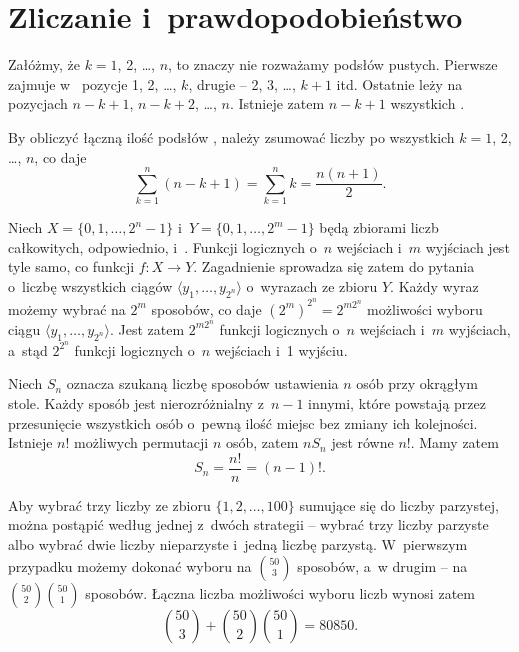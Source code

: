 \chapter{Zliczanie i~prawdopodobieństwo}


\exercise %
Załóżmy, że $k=1$, 2, \dots, $n$, to znaczy nie rozważamy podsłów pustych.
Pierwsze  zajmuje w~ pozycje 1, 2, \dots, $k$, drugie -- 2, 3, \dots, $k+1$ itd.
Ostatnie  leży na pozycjach $n-k+1$, $n-k+2$, \dots, $n$.
Istnieje zatem $n-k+1$ wszystkich  .

By obliczyć łączną ilość podsłów , należy zsumować liczby  po wszystkich $k=1$, 2, \dots, $n$, co daje
\[
	\sum_{k=1}^n(n-k+1) = \sum_{k=1}^nk = \frac{n(n+1)}{2}.
\]

\exercise %
Niech $X=\{0,1,\dots,2^n-1\}$ i~$Y=\{0,1,\dots,2^m-1\}$ będą zbiorami liczb całkowitych, odpowiednio,  i~.
Funkcji logicznych o~$n$ wejściach i~$m$ wyjściach jest tyle samo, co funkcji $f\colon X\to Y$.
Zagadnienie sprowadza się zatem do pytania o~liczbę wszystkich ciągów $\langle y_1,\dots,y_{2^n}\!\rangle$ o~wyrazach ze zbioru $Y$.
Każdy wyraz możemy wybrać na $2^m$ sposobów, co daje $(2^m)^{2^n}=2^{m2^n}\!$ możliwości wyboru ciągu $\langle y_1,\dots,y_{2^n}\!\rangle$.
Jest zatem $2^{m2^n}\!$ funkcji logicznych o~$n$ wejściach i~$m$ wyjściach, a~stąd $2^{2^n}\!$ funkcji logicznych o~$n$ wejściach i~1 wyjściu.

\exercise %
Niech $S_n$ oznacza szukaną liczbę sposobów ustawienia $n$ osób przy okrągłym stole.
Każdy sposób jest nierozróżnialny z~$n-1$ innymi, które powstają przez przesunięcie wszystkich osób o~pewną ilość miejsc bez zmiany ich kolejności.
Istnieje $n!$ możliwych permutacji $n$ osób, zatem $nS_n$ jest równe $n!$.
Mamy zatem
\[
	S_n = \frac{n!}{n} = (n-1)!.
\]

\exercise %
Aby wybrać trzy liczby ze zbioru $\{1,2,\dots,100\}$ sumujące się do liczby parzystej, można postąpić według jednej z~dwóch strategii -- wybrać trzy liczby parzyste albo wybrać dwie liczby nieparzyste i~jedną liczbę parzystą.
W~pierwszym przypadku możemy dokonać wyboru na $\binom{50}{3}$ sposobów, a~w drugim -- na $\binom{50}{2}\binom{50}{1}$ sposobów.
Łączna liczba możliwości wyboru liczb wynosi zatem
\[
	\binom{50}{3}+\binom{50}{2}\binom{50}{1} = 80850.
\]

